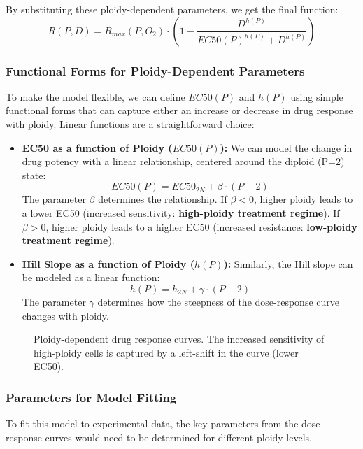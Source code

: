 \documentclass{article}
\begin{document}
By substituting these ploidy-dependent parameters, we get the final function:
\color{blue}
$$
R(P, D) = R_{max}(P, O_2) \cdot \left(1 - \frac{D^{h(P)}}{EC50(P)^{h(P)} + D^{h(P)}}\right)
$$
\color{black}

\subsubsection*{Functional Forms for Ploidy-Dependent Parameters}
To make the model flexible, we can define $EC50(P)$ and $h(P)$ using simple functional forms that can capture either an increase or decrease in drug response with ploidy. Linear functions are a straightforward choice:

\begin{itemize}
    \item \textbf{EC50 as a function of Ploidy ($EC50(P)$):} We can model the change in drug potency with a linear relationship, centered around the diploid (P=2) state:
    $$ EC50(P) = EC50_{2N} + \beta \cdot (P - 2) $$
    \color{blue}
    The parameter $\beta$ determines the relationship. If $\beta < 0$, higher ploidy leads to a lower EC50 (increased sensitivity: \textbf{ high-ploidy treatment regime}). If $\beta > 0$, higher ploidy leads to a higher EC50 (increased resistance:  \textbf{low-ploidy treatment regime}).
    \color{black}
    \item \textbf{Hill Slope as a function of Ploidy ($h(P)$):} Similarly, the Hill slope can be modeled as a linear function:
    $$ h(P) = h_{2N} + \gamma \cdot (P - 2) $$
    \color{blue}
    The parameter $\gamma$ determines how the steepness of the dose-response curve changes with ploidy.
    \color{black}
\end{itemize}

\begin{figure}[h!]
\centering
{}
\caption{Ploidy-dependent drug response curves. The increased sensitivity of high-ploidy cells is captured by a left-shift in the curve (lower EC50).}
\label{fig:drug_response}
\end{figure}

\subsubsection*{Parameters for Model Fitting}
To fit this model to experimental data, the key parameters from the dose-response curves would need to be determined for different ploidy levels.
\end{document}
